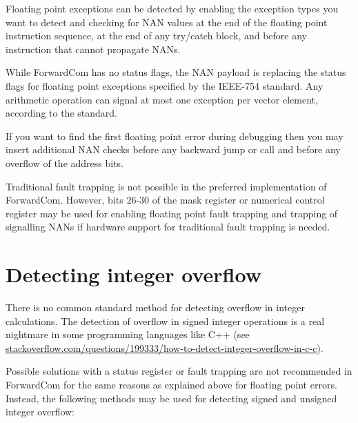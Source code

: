 \documentclass[forwardcom.tex]{subfiles}
\begin{document}
Floating point exceptions can be detected by enabling the exception types you want to detect and checking for NAN values at the end of the floating point instruction sequence, at the end of any 
try/catch block, and before any instruction that cannot propagate NANs. 
\vspace{2mm} 

While ForwardCom has no status flags, the NAN payload is replacing the 
status flags for floating point exceptions specified by the IEEE-754 standard. 
Any arithmetic operation can signal at most one exception per vector element, according to the standard.
\vspace{2mm} 

If you want to find the first floating point error during debugging then you may insert additional NAN checks before any backward jump or call and before any overflow of the address bits.
\vspace{2mm}

Traditional fault trapping is not possible in the preferred implementation of ForwardCom. However, bits 26-30 of the mask register or numerical control register may be used for enabling floating point fault trapping and trapping of signalling NANs if hardware support for traditional fault trapping is needed.
\vspace{2mm}



\section{Detecting integer overflow} 
\label{integerOverflowDetection}
There is no common standard method for detecting overflow in integer calculations. The detection of overflow in signed integer operations is a real nightmare in some programming languages like C++ (see 
\href{http://stackoverflow.com/questions/199333/how-to-detect-integer-overflow-in-c-c}{stackoverflow.com/questions/199333/how-to-detect-integer-overflow-in-c-c}).
\vspace{2mm}

Possible solutions with a status register or fault trapping are not recommended in ForwardCom for the same reasons as explained above for floating point errors. 
Instead, the following methods may be used for detecting signed and unsigned integer overflow: 
\end{document}
